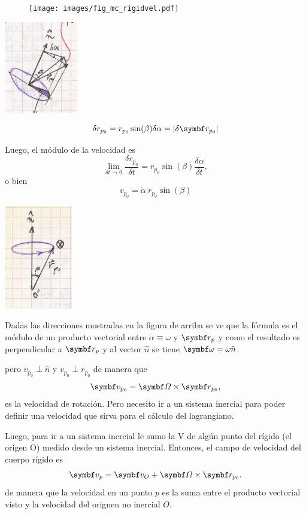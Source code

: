 \documentclass[10pt,oneside]{CBFT_book}
\begin{document}
\begin{figure}[htb]
	\begin{center}
	\texttt{[image: images/fig\_mc\_rigidvel.pdf]}	 
	\end{center}
	\caption{}
\end{figure} 

\includegraphics[scale=0.4]{images/fig_mc_rigid_body_vel2.jpg}

\[
	\delta r_{p_0} = r_{p_0} \sin(\beta) \delta \alpha = | \delta \vb{r}_{p_0} |
\]

Luego, el módulo de la velocidad es 
\[
	\lim_{\delta t \to 0} \frac{\delta r_{p_0}}{\delta t} = 
	r_{p_0} \sin(\beta) \frac{\delta\alpha}{\delta t},
\]
o bien 
\[
	v_{p_0} = \dot{\alpha} \: r_{p_0} \sin(\beta)
\]

\includegraphics[scale=0.4]{images/fig_mc_rigid_body_vel3.jpg}

Dadas las direcciones mostradas en la figura de arriba se ve que la fórmula es el
módulo de un producto vectorial entre $\dot{\alpha} \equiv \omega$ y $\vb{r}_p$ y como el resultado
es perpendicular a $\vb{r}_p$ y al vector $\hat{n}$ se tiene $\vb{\omega} = \omega \hat{n}$.

pero $v_{p_0} \perp \hat{n}$ y $v_{p_0} \perp r_{p_0}$ de manera que 
\[
	\vb{v}_{p_0} = \vb{\Omega} \times \vb{r}_{p_0},
\]
es la velocidad de rotación.
Pero necesito ir a un sistema inercial para poder definir una velocidad que sirva para el
cálculo del lagrangiano.

Luego, para ir a un sistema inercial le sumo la V de algún punto del rígido (el origen O)
medido desde un sistema inercial. Entonces, el campo de velocidad del cuerpo rígido es
\[
	\vb{v}_{p} = \vb{v}_O + \vb{\Omega} \times \vb{r}_{p_0}.
\]
de manera que la velocidad en un punto $p$ es la suma entre el producto vectorial visto y 
la velocidad del orignen no inercial $O$.
\end{document}
